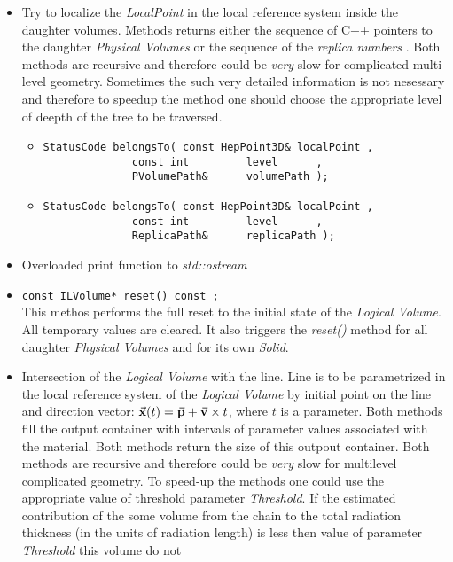\begin{itemize}
\item Try to localize the {\it LocalPoint} in the local reference system inside the 
daughter volumes. Methods returns either the sequence of C++ pointers to the 
daughter {\it Physical Volumes} or the sequence of the {\it  replica numbers }.
Both methods are recursive and therefore could be {\it very } slow for complicated 
multi-level geometry. Sometimes the such very detailed  information is not nesessary
and therefore to speedup the method one should choose the appropriate 
level of deepth of the tree to be traversed.
\begin{itemize} 
\item  
\begin{verbatim} 
StatusCode belongsTo( const HepPoint3D& localPoint ,
		      const int         level      , 
		      PVolumePath&      volumePath );
\end{verbatim}
\item 
\begin{verbatim}
StatusCode belongsTo( const HepPoint3D& localPoint ,
		      const int         level      , 
		      ReplicaPath&      replicaPath );        
\end{verbatim} 
\end{itemize} 
\item Overloaded print function to {\it std::ostream } 
\item 
\verb+const ILVolume* reset() const ;+
\\ This methos performs the full reset to the initial state 
of the {\it Logical Volume}. All temporary values are cleared. 
It also triggers the {\it reset()} method for all daughter 
{\it Physical Volumes} and for its own {\it Solid}.
\item 
Intersection of the {\it Logical Volume} with the line. 
Line is to be parametrized in the local reference system of the 
{\it Logical Volume} by initial point on the line and direction vector:
$\vec{\bf x}(t) = \vec{\bf p} + \vec{\bf v}\times t$, where $t$ is 
a parameter. Both methods fill the output container with 
intervals of parameter values associated with the material.
Both methods return the size of this outpout container. 
Both methods are recursive and therefore could be {\it very} slow
for multilevel complicated geometry. To speed-up the methods one could 
use the appropriate value of threshold parameter {\it Threshold}.
If the estimated contribution of the some volume from the chain 
to the total radiation thickness (in the units of radiation length) 
is less then value of parameter {\it Threshold} this volume do not 

\end{itemize}
